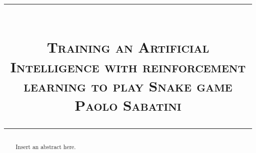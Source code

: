 \documentclass{article}
\title{
\begin{flushleft}
\rule{\textwidth}{1pt}\\
  \textsc{\textbf{Training an Artificial Intelligence with reinforcement learning to play Snake game}}\\[2mm]
\textsc{\large Paolo Sabatini}\\
\rule{\textwidth}{1pt}
  \end{flushleft}
}
\date{}
\begin{document}
\maketitle


\begin{abstract}

  Insert an abstract here.
  
\end{abstract}
\vspace{2cm}
\tableofcontents

\newpage


\begin{thebibliography}{9}

\end{thebibliography}


\newpage
\begin{appendices}

\end{appendices}
\end{document}
